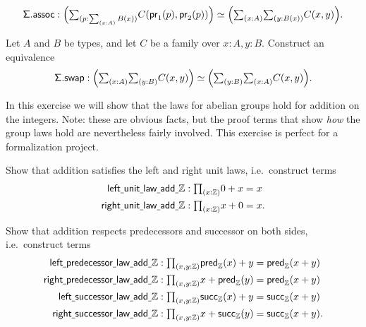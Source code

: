 \begin{exercises}
\begin{equation*}
\mathsf{\Sigma.assoc}:\eqv{\Big(\sm{p:\sm{x:A}B(x)}C(\proj 1(p),\proj 2(p))\Big)}{\Big(\sm{x:A}\sm{y:B(x)}C(x,y)\Big)}.
\end{equation*}
\item \label{ex:sigma_swap}Let $A$ and $B$ be types, and let $C$ be a family over $x:A,y:B$. Construct an equivalence
\begin{equation*}
\mathsf{\Sigma.swap}:\eqv{\Big(\sm{x:A}{y:B}C(x,y)\Big)}{\Big(\sm{y:B}{x:A}C(x,y)\Big)}.
\end{equation*}
\item \label{ex:int_group_laws} In this exercise we will show that the laws for abelian groups hold for addition on the integers. Note: these are obvious facts, but the proof terms that show \emph{how} the group laws hold are nevertheless fairly involved. This exercise is perfect for a formalization project. 
\begin{subexenum}
\item Show that addition satisfies the left and right unit laws, i.e.~construct terms
\begin{align*}
\mathsf{left\usc{}unit\usc{}law\usc{}add\usc{}}\Z  & : \prd{x:\Z} 0 + x = x \\
\mathsf{right\usc{}unit\usc{}law\usc{}add\usc{}}\Z  & : \prd{x : \Z} x + 0 = x.
\end{align*}
\item Show that addition respects predecessors and successor on both sides, i.e.~construct terms
\begin{align*}
\mathsf{left\usc{}predecessor\usc{}law\usc{}add\usc{}}\Z & : \prd{x,y:\Z} \mathsf{pred}_{\mathbb{Z}}(x)+y = \mathsf{pred}_{\mathbb{Z}}(x+y) \\
\mathsf{right\usc{}predecessor\usc{}law\usc{}add\usc{}}\Z & : \prd{x,y:\Z} x+\mathsf{pred}_{\mathbb{Z}}(y) = \mathsf{pred}_{\mathbb{Z}}(x+y) \\
\mathsf{left\usc{}successor\usc{}law\usc{}add\usc{}}\Z & : \prd{x,y:\Z} \mathsf{succ}_{\mathbb{Z}}(x)+y = \mathsf{succ}_{\mathbb{Z}}(x+y) \\
\mathsf{right\usc{}successor\usc{}law\usc{}add\usc{}}\Z & : \prd{x,y:\Z} x+\mathsf{succ}_{\mathbb{Z}}(y) = \mathsf{succ}_{\mathbb{Z}}(x+y).

\end{align*}
\end{subexenum}
\end{exercises}

